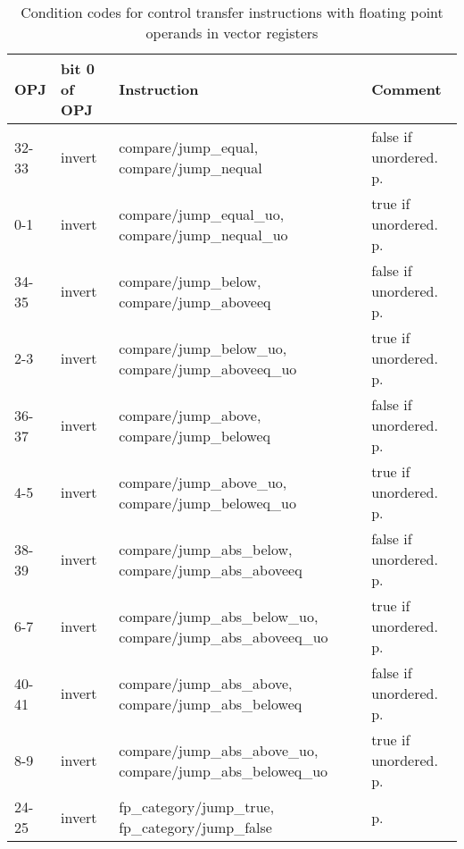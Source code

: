 \documentclass[forwardcom.tex]{subfiles}
\begin{document}
\begin{longtable}
{|p{10mm}|p{14mm}|p{65mm}|p{40mm}|}
\caption{Condition codes for control transfer instructions with floating point operands in vector registers }
\label{table:controlTransferInstructionsFloat}
\endfirsthead
\endhead
\hline
OPJ & bit 0 \newline of OPJ & Instruction & Comment \\
\hline
32-33 & invert & compare/jump\_equal, \newline compare/jump\_nequal & false if unordered. p. \pageref{table:floatCompareJumpInstructions} \\
\hline
0-1 & invert & compare/jump\_equal\_uo, \newline compare/jump\_nequal\_uo & true if unordered. p. \pageref{table:floatCompareJumpInstructions} \\
\hline
34-35 & invert & compare/jump\_below, \newline compare/jump\_aboveeq & false if unordered. p. \pageref{table:floatCompareJumpInstructions} \\
\hline
2-3 & invert & compare/jump\_below\_uo, \newline compare/jump\_aboveeq\_uo & true if unordered. p. \pageref{table:floatCompareJumpInstructions} \\
\hline
36-37 & invert & compare/jump\_above, \newline compare/jump\_beloweq & false if unordered. p. \pageref{table:floatCompareJumpInstructions} \\
\hline
4-5 & invert & compare/jump\_above\_uo, \newline compare/jump\_beloweq\_uo & true if unordered. p. \pageref{table:floatCompareJumpInstructions} \\
\hline
38-39 & invert & compare/jump\_abs\_below, \newline compare/jump\_abs\_aboveeq & false if unordered. p. \pageref{table:floatCompareJumpInstructions} \\
\hline
6-7 & invert & compare/jump\_abs\_below\_uo, \newline compare/jump\_abs\_aboveeq\_uo & true if unordered. p. \pageref{table:floatCompareJumpInstructions} \\
\hline
40-41 & invert & compare/jump\_abs\_above, \newline compare/jump\_abs\_beloweq & false if unordered. p. \pageref{table:floatCompareJumpInstructions} \\
\hline
8-9 & invert & compare/jump\_abs\_above\_uo, \newline compare/jump\_abs\_beloweq\_uo & true if unordered. p. \pageref{table:floatCompareJumpInstructions} \\
\hline
24-25 & invert & fp\_category/jump\_true, \newline fp\_category/jump\_false &  p. \pageref{table:floatCompareJumpInstructions}\\
\hline


\end{longtable}
\end{document}
